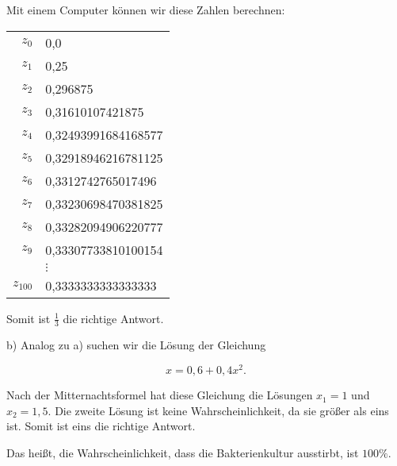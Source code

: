 \documentclass{article}
\begin{document}
Mit einem Computer können wir diese Zahlen berechnen:

\begin{tabular}{r|l}
  $z_0$ & 0,0 \\
  $z_1$ & 0,25 \\
  $z_2$ & 0,296875 \\
  $z_3$ & 0,31610107421875 \\
  $z_4$ & 0,32493991684168577 \\
  $z_5$ & 0,32918946216781125 \\
  $z_6$ & 0,3312742765017496 \\
  $z_7$ & 0,33230698470381825 \\
  $z_8$ & 0,33282094906220777 \\
  $z_9$ & 0,33307733810100154 \\
  & $\vdots$ \\
  $z_{100}$ & 0,3333333333333333
\end{tabular}

Somit ist $\tfrac{1}{3}$ die richtige Antwort.

b) Analog zu a) suchen wir die Lösung der Gleichung

\[ x = 0,6 + 0,4 x^2. \]

Nach der Mitternachtsformel hat diese Gleichung die Lösungen $x_1 = 1$ und $x_2 = 1,5$. Die zweite Lösung ist keine Wahrscheinlichkeit, da sie größer als eins ist. Somit ist eins die richtige Antwort.

Das heißt, die Wahrscheinlichkeit, dass die Bakterienkultur ausstirbt, ist $100\%$.
\end{document}
